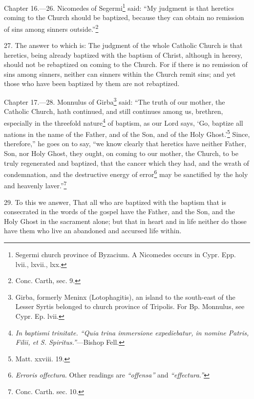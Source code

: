 Chapter 16.—26. Nicomedes of Segermi\footnote{\par  Segermi church province of Byzacium. A Nicomedes occurs in Cypr. Epp. lvii., lxvii., lxx.} said: ``My judgment is that heretics coming to the Church should be baptized, because they can obtain no remission of sins among sinners outside.''\footnote{\par  Conc. Carth, sec. 9.}

27. The answer to which is: The judgment of the whole Catholic Church is that heretics, being already baptized with the baptism of Christ, although in heresy, should not be rebaptized on coming to the Church. For if there is no remission of sins among sinners, neither can sinners within the Church remit sins; and yet those who have been baptized by them are not rebaptized.


Chapter 17.—28. Monnulus of Girba\footnote{\par  Girba, formerly Meninx (Lotophagitis), an island to the south-east of the Lesser Syrtis belonged to church province of Tripolis. For Bp. Monnulus, see Cypr. Ep. lvii.} said: ``The truth of our mother, the Catholic Church, hath continued, and still continues among us, brethren, especially in the threefold nature\footnote{\par  \emph{In baptismi trinitate. ``Quia trina immersione expediebatur, in nomine Patris, Filii, et S. Spiritus.''}—Bishop Fell.} of baptism, as our Lord says, ‘Go, baptize all nations in the name of the Father, and of the Son, and of the Holy Ghost.’\footnote{\par  Matt. xxviii. 19.} Since, therefore,'' he goes on to say, ``we know clearly that heretics have neither Father, Son, nor Holy Ghost, they ought, on coming to our mother, the Church, to be truly regenerated and baptized, that the cancer which they had, and the wrath of condemnation, and the destructive energy of error\footnote{\par  \emph{Erroris offectura}. Other readings are \emph{``offensa''} and \emph{``effectura.''}} may be sanctified by the holy and heavenly laver.''\footnote{\par  Conc. Carth. sec. 10.}

29. To this we answer, That all who are baptized with the baptism that is consecrated in the words of the gospel have the Father, and the Son, and the Holy Ghost in the sacrament alone; but that in heart and in life neither do those have them who live an abandoned and accursed life within.

